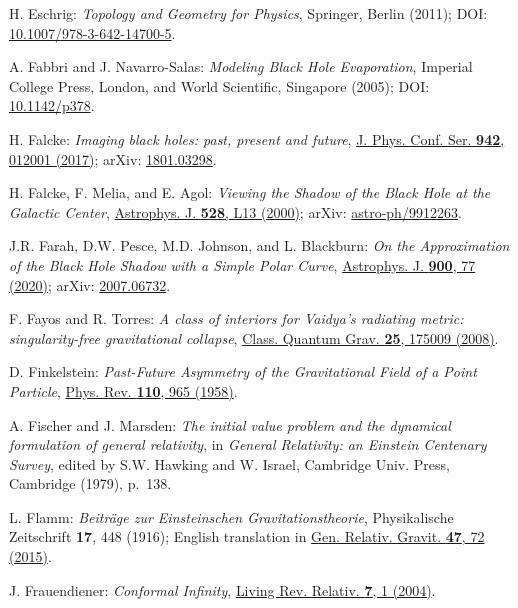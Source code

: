 \begin{thebibliography}{123}
H. Eschrig: {\em Topology and Geometry for Physics},
Springer, Berlin (2011);
DOI: \href{https://doi.org/10.1007/978-3-642-14700-5}{10.1007/978-3-642-14700-5}.

A. Fabbri and J. Navarro-Salas:
{\em Modeling Black Hole Evaporation},
Imperial College Press, London, and World Scientific, Singapore (2005);
DOI: \href{https://doi.org/10.1142/p378}{10.1142/p378}.

H. Falcke:
{\em Imaging black holes: past, present and future},
\href{https://doi.org/10.1088/1742-6596/942/1/012001}{J. Phys. Conf. Ser. {\bf 942}, 012001 (2017)};
arXiv: \href{https://arxiv.org/abs/1801.03298}{1801.03298}.

H. Falcke, F. Melia, and E. Agol:
{\em Viewing the Shadow of the Black Hole at the Galactic Center},
\href{https://doi.org/10.1086/312423}{Astrophys. J. {\bf 528}, L13 (2000)};
arXiv: \href{https://arxiv.org/abs/astro-ph/9912263}{astro-ph/9912263}.

J.R. Farah, D.W. Pesce, M.D. Johnson, and L. Blackburn:
{\em On the Approximation of the Black Hole Shadow with a Simple Polar Curve},
\href{https://doi.org/10.3847/1538-4357/aba59a}{Astrophys. J. {\bf 900}, 77 (2020)};
arXiv: \href{https://arxiv.org/abs/2007.06732}{2007.06732}.

F. Fayos and R. Torres:
{\em A class of interiors for Vaidya's radiating metric: singularity-free gravitational collapse},
\href{https://doi.org/10.1088/0264-9381/25/17/175009}{Class. Quantum Grav. {\bf 25}, 175009 (2008)}.

D. Finkelstein:
{\em Past-Future Asymmetry of the Gravitational Field of a Point Particle},
\href{https://doi.org/10.1103/PhysRev.110.965}{Phys. Rev. {\bf 110}, 965 (1958)}.

A. Fischer and J. Marsden:
{\em The initial value problem and the dynamical formulation of general relativity},
in {\em General Relativity: an Einstein
Centenary Survey}, edited by S.W. Hawking and W. Israel,
Cambridge Univ. Press, Cambridge (1979), p.~138.

L. Flamm: {\em Beiträge zur Einsteinschen Gravitationstheorie},
Physikalische Zeitschrift {\bf 17}, 448 (1916); English translation in
\href{https://doi.org/10.1007/s10714-015-1908-2}{Gen. Relativ. Gravit. {\bf 47}, 72 (2015)}.

J. Frauendiener:
{\em Conformal Infinity},
\href{https://doi.org/10.12942/lrr-2004-1}{Living Rev. Relativ. {\bf 7}, 1 (2004)}.


\end{thebibliography}

